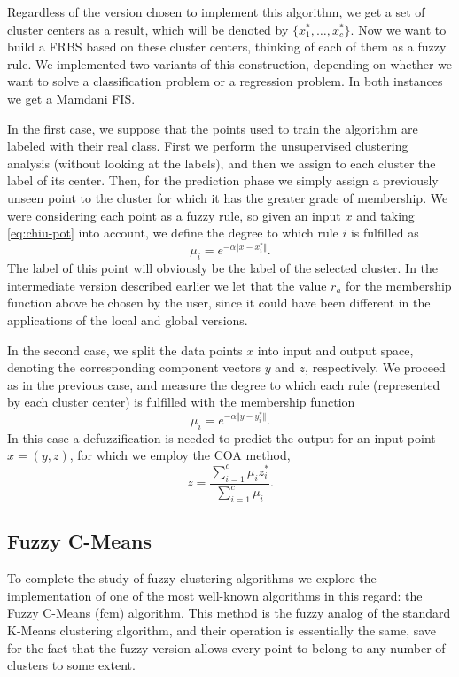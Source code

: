 Regardless of the version chosen to implement this algorithm, we get a set of cluster centers as a result, which will be denoted by $\{x_1^\ast, \dots, x_c^\ast \}$. Now we want to build a FRBS based on these cluster centers, thinking of each of them as a fuzzy rule. We implemented two variants of this construction, depending on whether we want to solve a classification problem or a regression problem. In both instances we get a Mamdani FIS.

In the first case, we suppose that the points used to train the algorithm are labeled with their real class. First we perform the unsupervised clustering analysis (without looking at the labels), and then we assign to each cluster the label of its center. Then, for the prediction phase we simply assign a previously unseen point to the cluster for which it has the greater grade of membership. We were considering each point as a fuzzy rule, so given an input $x$ and taking \eqref{eq:chiu-pot} into account, we define the degree to which rule $i$ is fulfilled as
\[
\mu_i = e^{-\alpha \Vert x - x_i^\ast \Vert}.
\]
The label of this point will obviously be the label of the selected cluster. In the intermediate version described earlier we let that the value $r_a$ for the membership function above be chosen by the user, since it could have been different in the applications of the local and global versions.

In the second case, we split the data points $x$ into input and output space, denoting the corresponding component vectors $y$ and $z$, respectively. We proceed as in the previous case, and measure the degree to which each rule (represented by each cluster center) is fulfilled with the membership function
\[
\mu_i = e^{-\alpha \Vert y - y_i^\ast \Vert}.
\]
In this case a defuzzification is needed to predict the output for an input point $x=(y,z)$, for which we employ the COA method,
\[
z = \dfrac{\displaystyle \sum_{i=1}^c \mu_iz_i^\ast}{\displaystyle \sum_{i=1}^c \mu_i}.
\]

\subsection{Fuzzy C-Means}

To complete the study of fuzzy clustering algorithms we explore the implementation of one of the most well-known algorithms in this regard: the Fuzzy C-Means (\acrshort{fcm}) algorithm. This method is the fuzzy analog of the standard K-Means clustering algorithm, and their operation is essentially the same, save for the fact that the fuzzy version allows every point to belong to any number of clusters to some extent.

